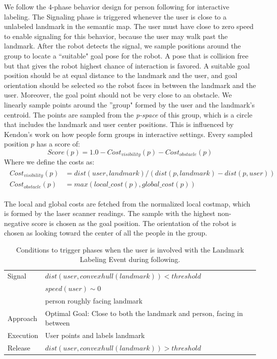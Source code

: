 \documentclass{tADR2e}
\begin{document}
We follow the 4-phase behavior design for person following for interactive labeling. The Signaling phase is triggered whenever the user is close to a unlabeled landmark in the semantic map. The user must have close to zero speed to enable signaling for this behavior, because the user may walk past the landmark. After the robot detects the signal, we sample positions around the group to locate a ``suitable" goal pose for the robot. A pose that is collision free but that gives the robot highest chance of interaction is favored. A suitable goal position should be at equal distance to the landmark and the user, and goal orientation should be selected so the robot faces in between the landmark and the user. Moreover, the goal point should not be very close to an obstacle. We linearly sample points around the ''group" formed by the user and the landmark's centroid. The points are sampled from the \textit{p-space} of this group, which is a circle that includes the landmark and user center positions. This is influenced by Kendon's work \cite{kendon1990conducting} on how people form groups in interactive settings. Every sampled position $p$ has a score of:
\[
Score(p) = 1.0 - Cost_{visibility}(p) - Cost_{obstacle}(p)
\]
Where we define the costs as:
\begin{align} 
\begin{split}
Cost_{visibility}(p)&=dist(user,landmark)/(dist(p,landmark)-dist(p,user)) \\
Cost_{obstacle}(p)&=max(local\_cost(p),global\_cost(p))
\end{split}
\end{align}

The local and global costs are fetched from the normalized local costmap, which is formed by the laser scanner readings. The sample with the highest non-negative score is chosen as the goal position. The orientation of the robot is chosen as looking toward the center of all the people in the group. 

\begin{table}[ht!]

	
    \centering
		
  \begin{tabular}{l |  m{10cm}}
    \toprule    
    Signal & {$dist(user, convex hull(landmark))<threshold$}\\       
	                           & {$speed(user)\sim 0$} \\
	                           & {person roughly facing landmark}\\ \midrule		                           		                                
    Approach & {Optimal Goal: Close to both the landmark and person, facing in between}\\       \midrule
    Execution & {User points and labels landmark}\\  \midrule
    Release & {$dist(user, convex hull(landmark))>threshold$}\\ 
    \bottomrule
  \end{tabular}
	\caption{Conditions to trigger phases when the user is involved with the Landmark Labeling Event during following.}    
    \label{table:situation_aware_list_landmark}
\end{table}
\end{document}
